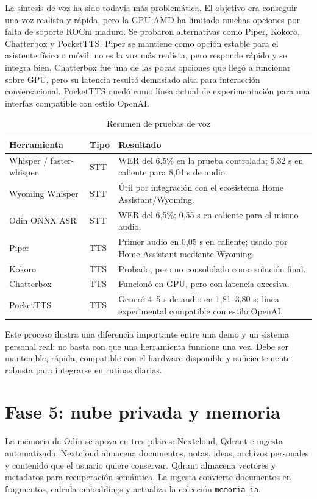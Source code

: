 La síntesis de voz ha sido todavía más problemática. El objetivo era conseguir una voz realista y rápida, pero la GPU AMD ha limitado muchas opciones por falta de soporte ROCm maduro. Se probaron alternativas como Piper, Kokoro, Chatterbox y PocketTTS. Piper se mantiene como opción estable para el asistente físico o móvil: no es la voz más realista, pero responde rápido y se integra bien. Chatterbox fue una de las pocas opciones que llegó a funcionar sobre GPU, pero su latencia resultó demasiado alta para interacción conversacional. PocketTTS quedó como línea actual de experimentación para una interfaz compatible con estilo OpenAI.

\begin{table}[H]
  \centering
  \caption{Resumen de pruebas de voz}
  \label{tab:voz-pruebas}
  \begin{tabularx}{\textwidth}{l l X}
    \toprule
    Herramienta & Tipo & Resultado \\
    \midrule
    Whisper / faster-whisper & STT & WER del 6,5\% en la prueba controlada; 5,32 s en caliente para 8,04 s de audio. \\
    Wyoming Whisper & STT & Útil por integración con el ecosistema Home Assistant/Wyoming. \\
    Odin ONNX ASR & STT & WER del 6,5\%; 0,55 s en caliente para el mismo audio. \\
    Piper & TTS & Primer audio en 0,05 s en caliente; usado por Home Assistant mediante Wyoming. \\
    Kokoro & TTS & Probado, pero no consolidado como solución final. \\
    Chatterbox & TTS & Funcionó en GPU, pero con latencia excesiva. \\
    PocketTTS & TTS & Generó 4--5 s de audio en 1,81--3,80 s; línea experimental compatible con estilo OpenAI. \\
    \bottomrule
  \end{tabularx}
\end{table}

Este proceso ilustra una diferencia importante entre una demo y un sistema personal real: no basta con que una herramienta funcione una vez. Debe ser mantenible, rápida, compatible con el hardware disponible y suficientemente robusta para integrarse en rutinas diarias.

\section{Fase 5: nube privada y memoria}
La memoria de Odín se apoya en tres pilares: Nextcloud, Qdrant e ingesta automatizada. Nextcloud almacena documentos, notas, ideas, archivos personales y contenido que el usuario quiere conservar. Qdrant almacena vectores y metadatos para recuperación semántica. La ingesta convierte documentos en fragmentos, calcula embeddings y actualiza la colección \texttt{memoria\_ia}.

